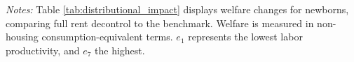 \documentclass[parskip=full]{article}
\newenvironment{fignote2}[1]
{
\par
\medskip
\begin{minipage}{#1}
\footnotesize
}
{
\end{minipage}
}
\begin{document}

    
\begin{table}[H]
    \centering
    \caption{Full rent decontrol: newborns' welfare gains and losses by labor productivity}
    \vspace{-0.5cm}
    \label{tab:distributional_impact}
    
    \vspace{-0.45cm}
    \begin{fignote2}{0.91\textwidth}
      \textit{Notes:} Table \ref{tab:distributional_impact} displays welfare changes for newborns, comparing full rent decontrol to the benchmark. Welfare is measured in non-housing consumption-equivalent terms. $e_{1}$ represents the lowest labor productivity, and $e_{7}$ the highest.
    \end{fignote2}
\end{table}
\end{document}
